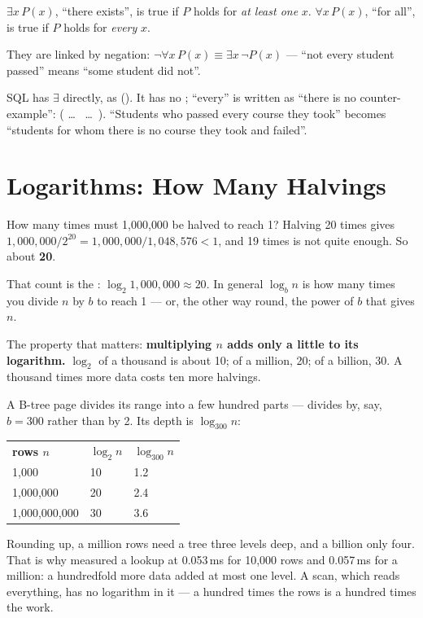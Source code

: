 \begin{definitionbox}
$\exists x\, P(x)$, ``there exists'', is true if $P$ holds for \emph{at least
one} $x$. $\forall x\, P(x)$, ``for all'', is true if $P$ holds for
\emph{every} $x$.

\smallskip
They are linked by negation: $\neg \forall x\, P(x) \equiv \exists x\, \neg
P(x)$ --- ``not every student passed'' means ``some student did not''.

\smallskip
SQL has $\exists$ directly, as  (). It has no
; ``every'' is written as ``there is no counter-example'':
 ( \dots\  \dots\ ). ``Students who passed every
course they took'' becomes ``students for whom there is no course they took
and failed''.
\end{definitionbox}

\section{Logarithms: How Many Halvings}

\begin{definitionbox}
How many times must 1{,}000{,}000 be halved to reach 1? Halving 20 times gives
$1{,}000{,}000 / 2^{20} = 1{,}000{,}000 / 1{,}048{,}576 < 1$, and 19 times is
not quite enough. So about \textbf{20}.

\smallskip
That count is the : $\log_2 1{,}000{,}000 \approx 20$. In
general $\log_b n$ is how many times you divide $n$ by $b$ to reach 1 --- or,
the other way round, the power of $b$ that gives $n$.

\smallskip
The property that matters: \textbf{multiplying $n$ adds only a little to its
logarithm.} $\log_2$ of a thousand is about 10; of a million, 20; of a
billion, 30. A thousand times more data costs ten more halvings.
\end{definitionbox}

\begin{examplebox}
A B-tree page divides its range into a few hundred parts --- divides by, say,
$b = 300$ rather than by 2. Its depth is $\log_{300} n$:

\medskip
\begin{tabular}{@{}R{3.6cm}R{3.4cm}R{3.4cm}@{}}
\textbf{rows $n$} & $\log_2 n$ & $\log_{300} n$ \\
1{,}000 & 10 & 1.2 \\
1{,}000{,}000 & 20 & 2.4 \\
1{,}000{,}000{,}000 & 30 & 3.6 \\
\end{tabular}

\smallskip
Rounding up, a million rows need a tree three levels deep, and a billion only
four. That is why  measured a lookup at 0.053\,ms for 10{,}000
rows and 0.057\,ms for a million: a hundredfold more data added at most one
level. A scan, which reads everything, has no logarithm in it --- a hundred
times the rows is a hundred times the work.
\end{examplebox}

